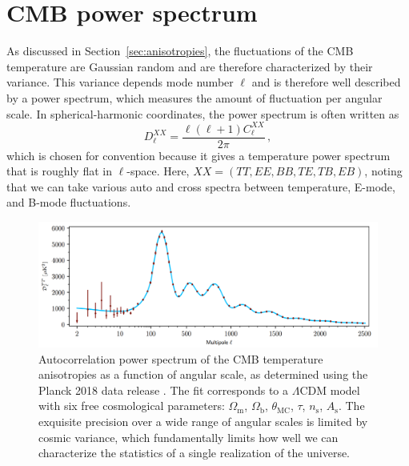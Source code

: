 
\section{CMB power spectrum}
\label{sec:cmb_power_spectrum}

As discussed in Section~\ref{sec:anisotropies}, the fluctuations of the CMB temperature are Gaussian random and are therefore characterized by their variance. This variance depends mode number $\ell$ and is therefore well described by a power spectrum, which measures the amount of fluctuation per angular scale. In spherical-harmonic coordinates, the power spectrum is often written as
\begin{equation}
    D_{\ell}^{XX} = \frac{\ell (\ell + 1) C_{\ell}^{XX}}{2 \pi} \, ,
    \label{eq:D_ell}
\end{equation}
which is chosen for convention because it gives a temperature power spectrum that is roughly flat in $\ell$-space. Here, $XX = (TT, EE, BB, TE, TB, EB)$, noting that we can take various auto and cross spectra between temperature, E-mode, and B-mode fluctuations.

\begin{figure}[!t]
    \centering
    \includegraphics[width=\linewidth]{ScientificMotivation/Figures/Planck_CMB_temperatureSpectrum_2019.png}
    \caption[Planck TT power spectrum]{Autocorrelation power spectrum of the CMB temperature anisotropies as a function of angular scale, as determined using the Planck 2018 data release \cite{planck_collaboration_planck_2019}. The fit corresponds to a $\Lambda$CDM model with six free cosmological parameters: $\Omega_{\mathrm{m}}$, $\Omega_{\mathrm{b}}$, $\theta_{\mathrm{MC}}$, $\tau$, $n_{\mathrm{s}}$, $A_{\mathrm{s}}$. The exquisite precision over a wide range of angular scales is limited by cosmic variance, which fundamentally limits how well we can characterize the statistics of a single realization of the universe.}
    \label{fig:cmb_tt_spectrum}
\end{figure}

